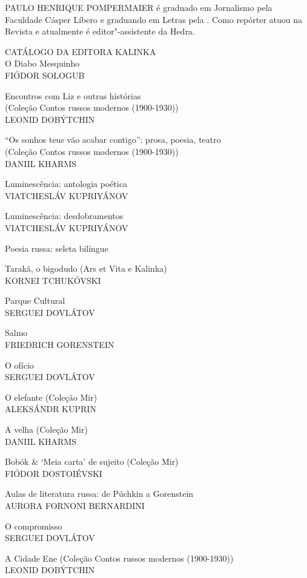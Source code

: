 \medskip

\noindent{}PAULO HENRIQUE POMPERMAIER é graduado em Jornalismo pela Faculdade Cásper Líbero e graduando em Letras pela . Como repórter atuou na Revista {} e atualmente é editor"-assistente da Hedra.

\afterpage{\blankpage}

\newpage
\pagestyle{empty}
\MyriadPro

\footnotesize{
\noindent{}CATÁLOGO DA EDITORA KALINKA\\[5pt]

\noindent{}O Diabo Mesquinho\\
FIÓDOR SOLOGUB
\medskip

\noindent{}Encontros com Liz e outras histórias\\(Coleção Contos russos modernos (1900-1930))\\
LEONID DOBÝTCHIN
\medskip

\noindent{}“Os sonhos teus vão acabar contigo”: prosa, poesia, teatro\\(Coleção Contos russos modernos (1900-1930))\\
DANIIL KHARMS
\medskip

\noindent{}Luminescência: antologia poética\\
VIATCHESLÁV KUPRIYÁNOV
\medskip

\noindent{}Luminescência: desdobramentos\\
VIATCHESLÁV KUPRIYÁNOV
\medskip

\noindent{}Poesia russa: seleta bilíngue
\medskip

\noindent{}Tarakã, o bigodudo (Ars et Vita e Kalinka)\\
KORNEI TCHUKÓVSKI
\medskip

\noindent{}Parque Cultural\\
SERGUEI DOVLÁTOV
\medskip

\noindent{}Salmo\\
FRIEDRICH GORENSTEIN
\medskip

\noindent{}O ofício\\
SERGUEI DOVLÁTOV
\medskip

\noindent{}O elefante (Coleção Mir)\\
ALEKSÁNDR KUPRIN
\medskip

\noindent{}A velha (Coleção Mir)\\
DANIIL KHARMS 
\medskip

\noindent{}Bobók \& ‘Meia carta’ de sujeito (Coleção Mir)\\
FIÓDOR DOSTOIÉVSKI
\medskip

\noindent{}Aulas de literatura russa: de Púchkin a Gorenstein \\
AURORA FORNONI BERNARDINI
\medskip

\noindent{}O compromisso\\
SERGUEI DOVLÁTOV
\medskip

\noindent{}A Cidade Ene (Coleção Contos russos modernos (1900-1930))\\
LEONID DOBÝTCHIN
}

